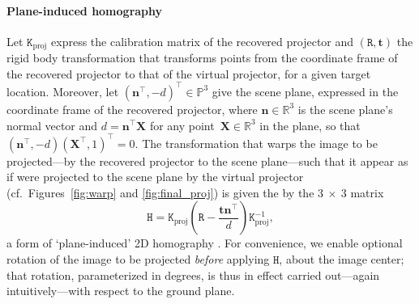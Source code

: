 \documentclass[review]{elsarticle}
\begin{document}
\paragraph{Plane-induced homography} Let $\mathtt{K}_\text{proj}$ express the calibration matrix of the recovered projector and $(\mathtt{R}, \mathbf{t})$ the rigid body transformation that transforms points from the coordinate frame of the recovered projector to that of the virtual projector, for a given target location. Moreover, let $(\mathbf{n}^\top, -d)^\top \in \mathbb{P}^3$ give the scene plane, expressed in the coordinate frame of the recovered projector, where $\mathbf{n} \in \mathbb{R}^3$ is the scene plane's normal vector and $d = \mathbf{n}^\top\mathbf{X}$ for any point~$\mathbf{X} \in \mathbb{R}^3$ in the plane, so that $(\mathbf{n}^\top, -d) (\mathbf{X}^\top, 1)^\top = 0$. The transformation that warps the image to be projected---by the recovered projector to the scene plane---such that it appear as if were projected to the scene plane by the virtual projector (cf.\ Figures~\ref{fig:warp} and \ref{fig:final_proj}) is given the by the $3~\times~3$ matrix
\begin{equation}
\mathtt{H} = \mathtt{K}_\text{proj}\left(\mathtt{R} - \frac{\mathbf{t}\mathbf{n}^\top}{d}\right)\mathtt{K}_\text{proj}^{-1},
\label{homgen}
\end{equation}
a form of `plane-induced' 2D homography \cite{Hartley2004}. For convenience, we enable optional rotation of the image to be projected \textit{before} applying $\mathtt{H}$, about the image center; that rotation, parameterized in degrees, is thus in effect carried out---again intuitively---with respect to the ground plane.
\end{document}
